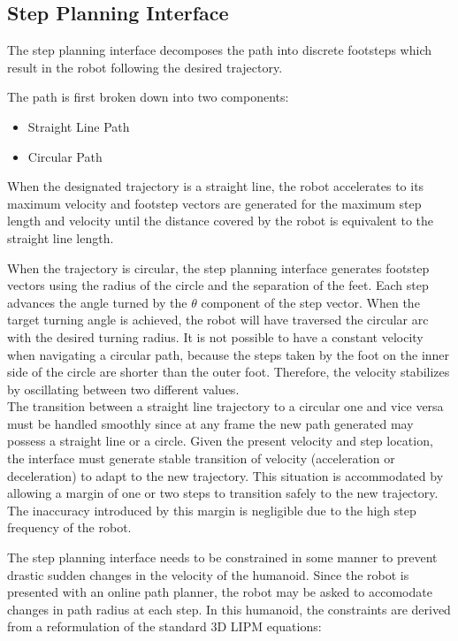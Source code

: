 \documentclass[letterpaper, 10 pt, conference]{ieeeconf}  %
\begin{document}
\subsection{Step Planning Interface}
The step planning interface decomposes the path into discrete footsteps which result in the robot following the desired trajectory.

The path is first broken down into two components:
\begin{itemize}
  \item Straight Line Path
  \item Circular Path
\end{itemize}

When the designated trajectory is a straight line, the robot accelerates to its maximum velocity and footstep vectors are generated for the maximum step length and velocity until the distance covered by the robot is equivalent to the straight line length. 
 
When the trajectory is circular, the step planning interface generates footstep vectors using the radius of the circle and the separation of the feet. Each step advances the angle turned by the $\theta$ component of the step vector. When the target turning angle is achieved, the robot will have traversed the circular arc with the desired turning radius. It is not possible to have a constant velocity when navigating a circular path, because the steps taken by the foot on the inner side of the circle are shorter than the outer foot. Therefore, the velocity stabilizes by oscillating between two different values. \\ 
The transition between a straight line trajectory to a circular one and vice versa must be handled smoothly since at any frame the new path generated may possess a straight line or a circle. Given the present velocity and step location, the interface must generate stable transition of velocity (acceleration or deceleration) to adapt to the new trajectory. This situation is accommodated by allowing a margin of one or two steps to transition safely to the new trajectory. The inaccuracy introduced by this margin is negligible due to the high step frequency of the robot.

The step planning interface needs to be constrained in some manner to prevent drastic sudden changes in the velocity of the humanoid. Since the robot is presented with an online path planner, the robot may be asked to accomodate changes in path radius at each step.
In this humanoid, the constraints are derived from a reformulation of the standard 3D LIPM equations:
\end{document}
